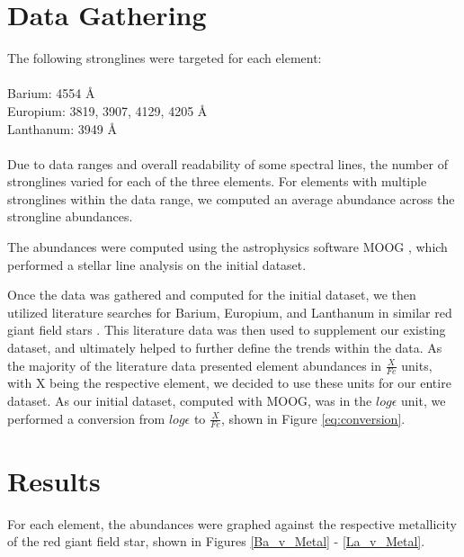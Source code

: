 \section{Data Gathering}
The following stronglines were targeted for each element: \\
\\
Barium: 4554 \AA \\
Europium: 3819, 3907, 4129, 4205 \AA \\
Lanthanum: 3949 \AA \\
\\
Due to data ranges and overall readability of some spectral lines, the number of stronglines varied for each of the three elements. For elements with multiple stronglines within the data range, we computed an average abundance across the strongline abundances.

The abundances were computed using the astrophysics software MOOG \cite{moog}, which performed a stellar line analysis on the initial dataset.

Once the data was gathered and computed for the initial dataset, we then utilized literature searches for Barium, Europium, and Lanthanum in similar red giant field stars \cite{burr00,mash00,spin16}. This literature data was then used to supplement our existing dataset, and ultimately helped to further define the trends within the data. As the majority of the literature data presented element abundances in $\frac{X}{Fe}$ units, with X being the respective element, we decided to use these units for our entire dataset. As our initial dataset, computed with MOOG, was in the $log\epsilon$ unit, we performed a conversion from $log\epsilon$ to $\frac{X}{Fe}$, shown in Figure \ref{eq:conversion}.

\section{Results}

For each element, the abundances were graphed against the respective metallicity of the red giant field star, shown in Figures \ref{Ba_v_Metal} - \ref{La_v_Metal}.

